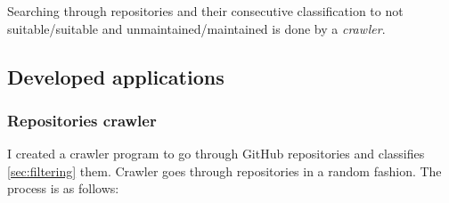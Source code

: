 Searching through repositories and their consecutive classification to not suitable/suitable and unmaintained/maintained is done by a \emph{crawler}.

\subsection{Developed applications}
\label{sec:applications}

\subsubsection{Repositories crawler}
\label{sec:crawler}

I created a crawler program to go through GitHub repositories and classifies \ref{sec:filtering} them.
Crawler goes through repositories in a random fashion.
The process is as follows:

